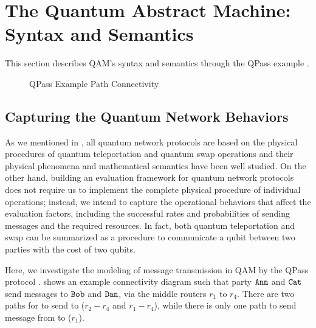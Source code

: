 \section{The Quantum Abstract Machine:  Syntax and Semantics} \label{sec:qam}

This section describes QAM's syntax and semantics through the QPass example \cite{10.1145/3387514.3405853}.

\begin{figure}[t]
{\small
\begin{center}
\end{center}
}
\caption{QPass Example Path Connectivity}
  \label{fig:q-pi-example}
\end{figure}

\subsection{Capturing the Quantum Network Behaviors} \label{sec:qamexample}

As we mentioned in , all quantum network protocols are based on the physical procedures of quantum teleportation and quantum swap operations and their physical phenomena and mathematical semantics have been well studied.
On the other hand, building an evaluation framework for quantum network protocols does not require us to implement the complete physical procedure of individual operations; 
instead, we intend to capture the operational behaviors that affect the evaluation factors,
including the successful rates and probabilities of sending messages and the required resources.
In fact, both quantum teleportation and swap can be summarized as a procedure to communicate a qubit between two parties with the cost of two qubits.

Here, we investigate the modeling of message transmission in QAM by the QPass protocol \cite{10.1145/3387514.3405853}.
 shows an example connectivity diagram such that party $\texttt{Ann}$ and $\texttt{Cat}$ send messages to $\texttt{Bob}$ and $\texttt{Dan}$, via the middle routers $r_1$ to $r_4$. There are two paths for  to send to  ($r_2 - r_4$ and $r_1 - r_4$), while there is only one path to send message from  to  ($r_1$). 

